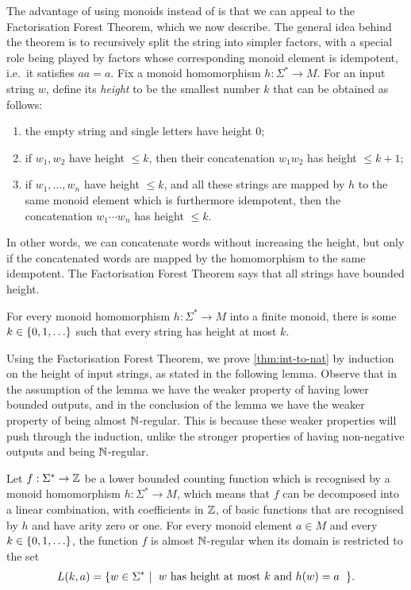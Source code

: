     The advantage of using monoids instead of \mso is that we can appeal to the  Factorisation Forest Theorem, which we now describe. The general idea behind the theorem is to recursively split the string into simpler factors, with a special role being played by factors whose corresponding monoid element is idempotent, i.e.~it satisfies $aa=a$.  Fix a monoid homomorphism $h : \Sigma^* \to M$. For an input string $w$,  define its \emph{height} to be the smallest number $k$ that can be obtained as follows:
\begin{enumerate}
    \item the empty string and single letters have  height $0$;
    \item if $w_1,w_2$ have height  $\leq k$, then their concatenation $w_1w_2$ has height  $\leq k+1$;
    \item if $w_1,\ldots,w_n$ have height $ \leq k$, and all these strings are mapped by $h$ to the same monoid element which is furthermore idempotent, 
 then the concatenation $w_1 \cdots w_n$ has height  $\leq k$.
\end{enumerate}
In other words, we can concatenate words without increasing the height, but only if the concatenated words are mapped by the homomorphism to the same idempotent. The Factorisation Forest Theorem says that all strings have bounded height.

\begin{theorem}
     For every monoid homomorphism $h : \Sigma^* \to M$ into a finite monoid, there is some $k \in \{0,1,\ldots\}$ such that every string has height at most $k$.
\end{theorem}

Using the Factorisation Forest Theorem, we  prove \cref{thm:int-to-nat} by induction on the height of input strings, as stated in the following lemma. Observe that in the assumption of the lemma we have the weaker property of having lower bounded outputs, and in the  conclusion of the lemma we have the weaker property of being almost ${\mathbb N}$-regular. This is because these weaker properties will push through the induction, unlike the stronger properties of having non-negative outputs and being ${\mathbb N}$-regular.     

\begin{lemma}\label{lem:induction-on-height}
    Let $f : \Sigma^* \to {\mathbb Z}$ be a lower bounded counting function which is recognised by a  monoid homomorphism $h : \Sigma^* \to M$, which means that $f$ can be decomposed into a linear combination, with coefficients in ${\mathbb Z}$, of basic functions that are recognised by $h$ and have arity zero or one. For every monoid element $a \in M$ and every $k \in \{0,1,\ldots\}$, the function $f$ is almost ${\mathbb N}$-regular when its domain is restricted to the set
    \begin{align*}
    L(k,a) = \setbuild{ w \in \Sigma^*}{$w$ has height at most $k$ and $h(w) = a$}.
    \end{align*}
\end{lemma}

